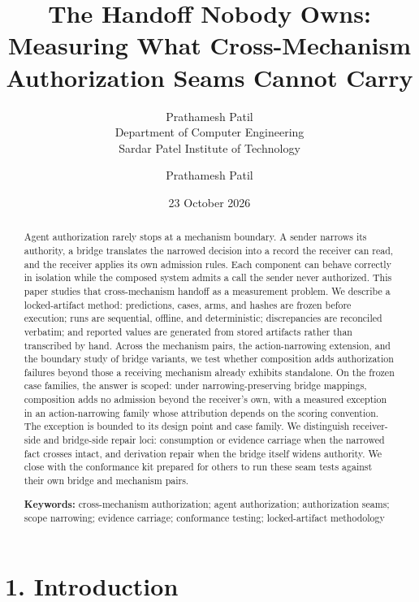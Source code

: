 \documentclass[
  10pt,
]{article}
\author{Prathamesh Patil\\Department of Computer Engineering\\Sardar Patel Institute of Technology}%
\title{The Handoff Nobody Owns: Measuring What Cross-Mechanism
Authorization Seams Cannot Carry}
\author{Prathamesh Patil}
\date{23 October 2026}
\renewcommand{\_}{\origunderscore\allowbreak}
\begin{document}
\maketitle

\begin{abstract}

Agent authorization rarely stops at a mechanism boundary. A sender
narrows its authority, a bridge translates the narrowed decision into a
record the receiver can read, and the receiver applies its own admission
rules. Each component can behave correctly in isolation while the
composed system admits a call the sender never authorized. This paper
studies that cross-mechanism handoff as a measurement problem. We
describe a locked-artifact method: predictions, cases, arms, and hashes
are frozen before execution; runs are sequential, offline, and
deterministic; discrepancies are reconciled verbatim; and reported
values are generated from stored artifacts rather than transcribed by
hand. Across the mechanism pairs, the action-narrowing extension, and
the boundary study of bridge variants, we test whether composition adds
authorization failures beyond those a receiving mechanism already
exhibits standalone. On the frozen case families, the answer is scoped:
under narrowing-preserving bridge mappings, composition adds no
admission beyond the receiver's own, with a measured exception in an
action-narrowing family whose attribution depends on the scoring
convention. The exception is bounded to its design point and case
family. We distinguish receiver-side and bridge-side repair loci:
consumption or evidence carriage when the narrowed fact crosses intact,
and derivation repair when the bridge itself widens authority. We close
with the conformance kit prepared for others to run these seam tests
against their own bridge and mechanism pairs.

\textbf{Keywords:} cross-mechanism authorization; agent authorization;
authorization seams; scope narrowing; evidence carriage; conformance
testing; locked-artifact methodology

\end{abstract}

\section{1. Introduction}\label{introduction}
\end{document}
